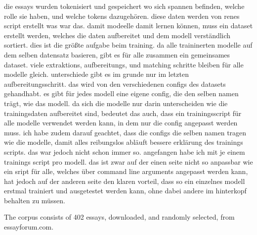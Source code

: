 \documentclass[12]{article}
\theoremstyle{mytheoremstyle}
\theoremstyle{mytheoremstyle}
\theoremstyle{myproblemstyle}
\begin{document}
  die essays wurden tokenisiert und gespeichert wo sich spannen befinden, welche rolle sie haben, und welche tokens dazugehören. diese daten werden von renes script erstellt was war das. damit modeelle damit lernen können, muss ein dataset erstellt werden, welches die daten aufbereitet und dem modell verständlich sortiert. dies ist die größte aufgabe beim training. da alle traininerten modelle auf dem selben datensatz basieren, gibt es für alle zusammen ein gemeinsames dataset. viele extraktions, aufbereitungs, und matching schritte bleiben für alle modelle gleich. unterschiede gibt es im grunde nur im letzten aufbereitungsschritt. das wird von den verschiedenen configs des datasets gehandhabt. es gibt für jedes modell eine eigene config, die den selben namen trägt, wie das modell. da sich die modelle nur darin unterscheiden wie die trainingsdaten aufbereitet sind, bedeutet das auch, dass ein trainingsscript für alle modelle verwendet werden kann, in dem nur die config angepasst werden muss. ich habe zudem darauf geachtet, dass die configs die selben namen tragen wie die modelle, damit alles reibungslos abläuft bessere erklärung des trainings scripts. das war jedoch nicht schon immer so. angefangen habe ich mit je einem trainings script pro modell. das ist zwar auf der einen seite nicht so anpassbar wie ein sript für alle, welches über command line arguments angepasst werden kann, hat jedoch auf der anderen seite den klaren vorteil, dass so ein einzelnes modell erstmal trainiert und ausgetestet werden kann, ohne dabei andere im hinterkopf behalten zu müssen. 

The corpus consists of 402 essays, downloaded, and randomly selected, from essayforum.com. 
\end{document}
